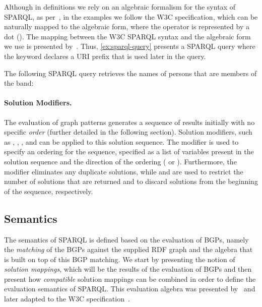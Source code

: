 %
Although in definitions we rely on an algebraic formalism for the syntax of SPARQL, as
per~\citet{PerezArenasGutierrez:2009aa}, in the examples we follow the \ac{W3C} specification, which can be naturally
mapped to the algebraic form, where the \AND operator is represented by a dot ().  The mapping between the
\ac{W3C} SPARQL syntax and the algebraic form we use is presented by~\citet{ArenasGutierrezPerez:2009ab}.
%
Thus, \cref{ex:sparql-query} presents a SPARQL query where the \PREFIX keyword declares a \ac{URI} prefix that is
used later in the query.
%
\begin{example} 
  \label{ex:sparql-query}
  The following SPARQL query retrieves the names of persons that are members of the  band:
  
\end{example}

\paragraph*{Solution Modifiers.}
\label{sec:solution-modifiers}

The evaluation of graph patterns generates a sequence of results initially with no specific \emph{order} (further
detailed in the following section).  Solution modifiers, such as \ORDERBY, \LIMIT, \OFFSET, and \DISTINCT can be applied
to this solution sequence.
%
The \ORDERBY modifier is used to specify an ordering for the sequence, specified as a list of variables present in the
solution sequence and the direction of the ordering ( or ).
%
Furthermore, the \DISTINCT modifier eliminates any duplicate solutions, while \LIMIT and \OFFSET are used to restrict
the number of solutions that are returned and to discard solutions from the beginning of the sequence, respectively.



\subsection*{Semantics}
\label{sec:sparql-semantics}


The semantics of SPARQL is defined based on the evaluation of \acp{BGP}, namely the \emph{matching} of the \acp{BGP}
against the supplied \ac{RDF} graph and the algebra that is built on top of this \ac{BGP} matching.
%
We start by presenting the notion of \emph{solution mappings}, which will be the results of the evaluation of \acp{BGP}
and then present how \emph{compatible} solution mappings can be combined in order to define the evaluation semantics of
SPARQL.
%
This evaluation algebra was presented by~\citet{Cyganiak:2005aa,PerezArenasGutierrez:2006aa} and later adapted to the
\ac{W3C} specification~\cite[Section~12.5]{PrudhommeauxSeaborne:2008aa}.

